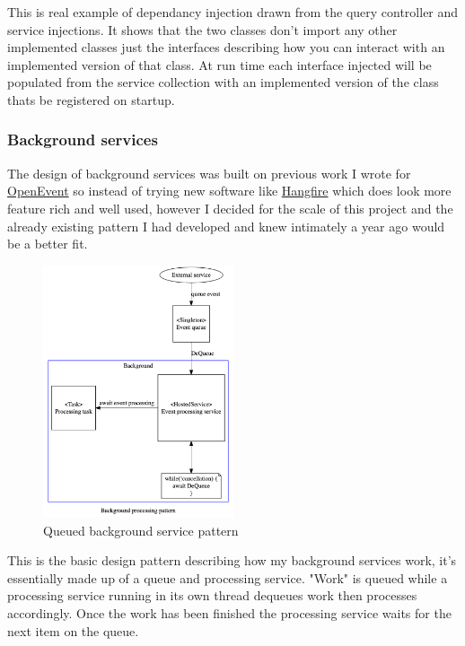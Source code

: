 This is real example of dependancy injection drawn from the query controller and service injections. It shows that the two classes don't import any other implemented classes just the interfaces describing how you can interact with an implemented version of that class. At run time each interface injected will be populated from the service collection with an implemented version of the class thats be registered on startup.

\subsubsection{Background services}

The design of background services was built on previous work I wrote for \href{https://github.com/mrharrisonbarker/openevent}{OpenEvent} so instead of trying new software like \href{https://www.hangfire.io/}{Hangfire} which does look more feature rich and well used, however I decided for the scale of this project and the already existing pattern I had developed and knew intimately a year ago would be a better fit.

\begin{figure}[H]
\caption{Queued background service pattern}
\centering
\includegraphics[width=0.5\textwidth,height=0.5\textheight,keepaspectratio]{images/patterns/background-processing-pattern}
\end{figure}

This is the basic design pattern describing how my background services work, it's essentially made up of a queue and processing service. "Work" is queued while a processing service running in its own thread dequeues work then processes accordingly. Once the work has been finished the processing service waits for the next item on the queue.

